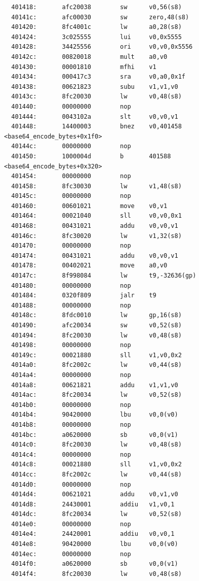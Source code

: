 \documentclass[11pt]{article}
\begin{document}
\begin{verbatim}
  401418:       afc20038        sw      v0,56(s8)
  40141c:       afc00030        sw      zero,48(s8)
  401420:       8fc4001c        lw      a0,28(s8)
  401424:       3c025555        lui     v0,0x5555
  401428:       34425556        ori     v0,v0,0x5556
  40142c:       00820018        mult    a0,v0
  401430:       00001810        mfhi    v1
  401434:       000417c3        sra     v0,a0,0x1f
  401438:       00621823        subu    v1,v1,v0
  40143c:       8fc20030        lw      v0,48(s8)
  401440:       00000000        nop
  401444:       0043102a        slt     v0,v0,v1
  401448:       14400003        bnez    v0,401458 <base64_encode_bytes+0x1f0>
  40144c:       00000000        nop
  401450:       1000004d        b       401588 <base64_encode_bytes+0x320>
  401454:       00000000        nop
  401458:       8fc30030        lw      v1,48(s8)
  40145c:       00000000        nop
  401460:       00601021        move    v0,v1
  401464:       00021040        sll     v0,v0,0x1
  401468:       00431021        addu    v0,v0,v1
  40146c:       8fc30020        lw      v1,32(s8)
  401470:       00000000        nop
  401474:       00431021        addu    v0,v0,v1
  401478:       00402021        move    a0,v0
  40147c:       8f998084        lw      t9,-32636(gp)
  401480:       00000000        nop
  401484:       0320f809        jalr    t9
  401488:       00000000        nop
  40148c:       8fdc0010        lw      gp,16(s8)
  401490:       afc20034        sw      v0,52(s8)
  401494:       8fc20030        lw      v0,48(s8)
  401498:       00000000        nop
  40149c:       00021880        sll     v1,v0,0x2
  4014a0:       8fc2002c        lw      v0,44(s8)
  4014a4:       00000000        nop
  4014a8:       00621821        addu    v1,v1,v0
  4014ac:       8fc20034        lw      v0,52(s8)
  4014b0:       00000000        nop
  4014b4:       90420000        lbu     v0,0(v0)
  4014b8:       00000000        nop
  4014bc:       a0620000        sb      v0,0(v1)
  4014c0:       8fc20030        lw      v0,48(s8)
  4014c4:       00000000        nop
  4014c8:       00021880        sll     v1,v0,0x2
  4014cc:       8fc2002c        lw      v0,44(s8)
  4014d0:       00000000        nop
  4014d4:       00621021        addu    v0,v1,v0
  4014d8:       24430001        addiu   v1,v0,1
  4014dc:       8fc20034        lw      v0,52(s8)
  4014e0:       00000000        nop
  4014e4:       24420001        addiu   v0,v0,1
  4014e8:       90420000        lbu     v0,0(v0)
  4014ec:       00000000        nop
  4014f0:       a0620000        sb      v0,0(v1)
  4014f4:       8fc20030        lw      v0,48(s8)

\end{verbatim}
\end{document}

